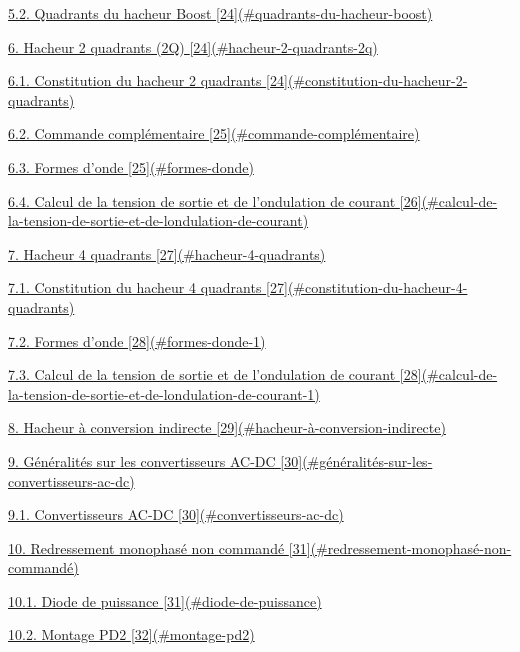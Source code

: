 \protect\hyperlink{quadrants-du-hacheur-boost}{5.2. Quadrants du hacheur Boost {[}24{]}(\#quadrants-du-hacheur-boost)}

\protect\hyperlink{hacheur-2-quadrants-2q}{6. Hacheur 2 quadrants (2Q) {[}24{]}(\#hacheur-2-quadrants-2q)}

\protect\hyperlink{constitution-du-hacheur-2-quadrants}{6.1. Constitution du hacheur 2 quadrants {[}24{]}(\#constitution-du-hacheur-2-quadrants)}

\protect\hyperlink{commande-compluxe9mentaire}{6.2. Commande complémentaire {[}25{]}(\#commande-complémentaire)}

\protect\hyperlink{formes-donde}{6.3. Formes d'onde {[}25{]}(\#formes-donde)}

\protect\hyperlink{calcul-de-la-tension-de-sortie-et-de-londulation-de-courant}{6.4. Calcul de la tension de sortie et de l'ondulation de courant {[}26{]}(\#calcul-de-la-tension-de-sortie-et-de-londulation-de-courant)}

\protect\hyperlink{hacheur-4-quadrants}{7. Hacheur 4 quadrants {[}27{]}(\#hacheur-4-quadrants)}

\protect\hyperlink{constitution-du-hacheur-4-quadrants}{7.1. Constitution du hacheur 4 quadrants {[}27{]}(\#constitution-du-hacheur-4-quadrants)}

\protect\hyperlink{formes-donde-1}{7.2. Formes d'onde {[}28{]}(\#formes-donde-1)}

\protect\hyperlink{calcul-de-la-tension-de-sortie-et-de-londulation-de-courant-1}{7.3. Calcul de la tension de sortie et de l'ondulation de courant {[}28{]}(\#calcul-de-la-tension-de-sortie-et-de-londulation-de-courant-1)}

\protect\hyperlink{hacheur-uxe0-conversion-indirecte}{8. Hacheur à conversion indirecte {[}29{]}(\#hacheur-à-conversion-indirecte)}

\protect\hyperlink{guxe9nuxe9ralituxe9s-sur-les-convertisseurs-ac-dc}{9. Généralités sur les convertisseurs AC-DC {[}30{]}(\#généralités-sur-les-convertisseurs-ac-dc)}

\protect\hyperlink{convertisseurs-ac-dc}{9.1. Convertisseurs AC-DC {[}30{]}(\#convertisseurs-ac-dc)}

\protect\hyperlink{redressement-monophasuxe9-non-commanduxe9}{10. Redressement monophasé non commandé {[}31{]}(\#redressement-monophasé-non-commandé)}

\protect\hyperlink{diode-de-puissance}{10.1. Diode de puissance {[}31{]}(\#diode-de-puissance)}

\protect\hyperlink{montage-pd2}{10.2. Montage PD2 {[}32{]}(\#montage-pd2)}

